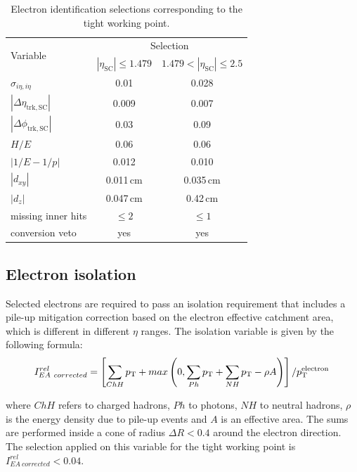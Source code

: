 \begin{table}[htb]
\caption{Electron identification selections corresponding to the tight working point.}\label{tab:tightele}
\centering
\begin{tabular}{lcc}
\toprule
\multirow{2}{*}{Variable} & \multicolumn{2}{c}{Selection}\\
 & $|\eta_\mathrm{SC}|\leq 1.479$ & $1.479 < |\eta_\mathrm{SC}| \leq 2.5$ \\
\midrule
$\sigma_{i\eta,i\eta}$ & 0.01 & 0.028 \\
$|\Delta\eta_\mathrm{trk,SC}|$ & 0.009 & 0.007 \\
$|\Delta\phi_\mathrm{trk,SC}|$ & 0.03 & 0.09 \\
$H/E$ & 0.06 & 0.06 \\
$|1/E - 1/p|$ & 0.012 & 0.010 \\
$|d_{xy}|$ & 0.011\,cm & 0.035\,cm\\
$|d_{z}|$ & 0.047\,cm & 0.42\,cm\\
missing inner hits & $\leq 2$ & $\leq 1$\\
conversion veto & yes & yes \\
\bottomrule
\end{tabular}
\end{table}

\subsection{Electron isolation}
Selected electrons are required to pass an isolation requirement that includes a pile-up mitigation correction based on the electron effective catchment area, which is different in different $\eta$ ranges. The isolation variable is given by the following formula:
\begin{equation}
I^{rel}_{EA~corrected} = \left[ \sum_{ChH}p_\mathrm{T} + max\left( 0, \sum_{Ph}p_\mathrm{T} + \sum_{NH}p_\mathrm{T} - \rho A \right) \right]/p_\mathrm{T}^\mathrm{electron} \,
\end{equation}

\noindent where $ChH$ refers to charged hadrons, $Ph$ to photons, $NH$ to neutral hadrons, $\rho$ is the energy density due to pile-up events and $A$ is an effective area. The sums are performed inside a cone of radius $\Delta R < 0.4$ around the electron direction. The selection applied on this variable for the tight working point is $I^{rel}_{EA~corrected} < 0.04$.

